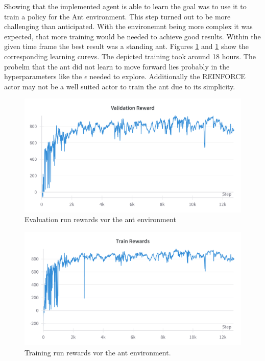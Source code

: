\documentclass[11pt, a4paper]{article}
\begin{document}
Showing that the implemented agent is able to learn the goal was to use it to train a policy
for the Ant environment.
This step turned out to be more challenging than anticipated.
With the environemnt being more complex it was expected, that more training would be
needed to achieve good results.
Within the given time frame the best result was a standing ant.
Figures \ref{REIN:ant_eval} and \ref{REIN:ant_eval} show the corresponding learning curevs.
The depicted training took around 18 hours.
The probelm that the ant did not learn to move forward lies probably in the hyperparameters like the
$\epsilon$ needed to explore. Additionally the REINFORCE actor may not be a well suited actor to
train the ant due to its simplicity.
\begin{figure}
    \centering
    \includegraphics[width=13cm]{reinforce_ant_val.png}
    \caption{Evaluation run rewards vor the ant environment}
    \label{REIN:ant_eval}
\end{figure}

\begin{figure}
    \centering
    \includegraphics[width=13cm]{reinforce_ant_train.png}
    \caption{Training run rewards vor the ant environment.}
    \label{REIN:ant_tra}
\end{figure}
\end{document}
